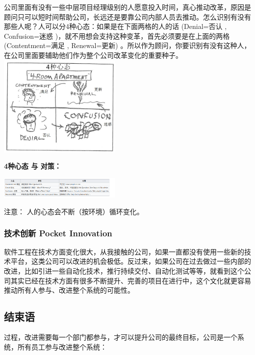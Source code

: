 公司里面有没有一些中层项目经理级别的人愿意投入时间，真心推动改革，原因是顾问只可以短时间帮助公司，长远还是要靠公司内部人员去推动。怎么识别有没有那些人呢？人可以分4种心态：如果是在下面两格的人的话
(Denial=否认 , Confusion=迷惑
)，就不用想会支持这种变革，首先必须要是在上面的两格(Contentment=满足 ,
Renewal=更新) 
。所以作为顾问，你要识别有没有这种人，在公司里面要辅助他们作为整个公司改革变化的重要种子。\\
\includegraphics[width=6cm]{P335_4_room_apartment1.jpg}

\textbf{4种心态 与 对策：}

\includegraphics[width=6cm]{Screenshotfrom2023-11-0304-11-55.png}

注意： 人的心态会不断（按环境）循环变化。

\hypertarget{ux6280ux672fux521bux65b0-pocket-innovation}{%
\subsubsection{技术创新 Pocket
Innovation}\label{ux6280ux672fux521bux65b0-pocket-innovation}}

软件工程在技术方面变化很大，从我接触的公司，如果一直都没有使用一些新的技术平台，这类公司可以改进的机会极低。反过来，如果公司在过去做过一些内部的改进，比如引进一些自动化技术，推行持续交付、自动化测试等等，就看到这个公司其实已经在技术方面有很多不断提升、完善的项目在进行中，这个文化就更容易推动所有人参与、改进整个系统的可能性。\\

\hypertarget{ux7ed3ux675fux8bed}{%
\subsection{结束语}\label{ux7ed3ux675fux8bed}}

过程，改进需要每一个部门都参与，才可以提升公司的最终目标，公司是一个系统，所有员工参与改进整个系统：

